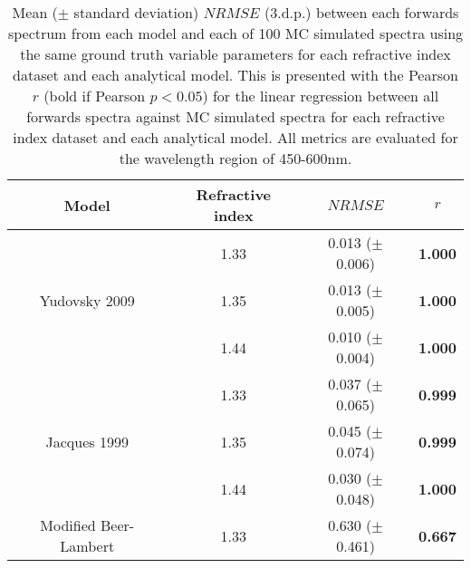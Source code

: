 \begin{table}[bhp]
    \centering
    \caption{Mean ($\pm$ standard deviation) $NRMSE$ (3.d.p.) between each forwards spectrum from each model and each of 100 MC simulated spectra using the same ground truth variable parameters for each refractive index dataset and each analytical model. This is presented with the Pearson $r$ (bold if Pearson $p < 0.05$) for the linear regression between all forwards spectra against MC simulated spectra for each refractive index dataset and each analytical model. All metrics are evaluated for the wavelength region of 450-600nm.}
    \begin{tabular}{|c|c|c|c|}
        \hline
        Model & Refractive index & $NRMSE$ & $r$ \\
        \hline
        \multirow{3}{*}{Yudovsky 2009} & 1.33 & 0.013 ($\pm$ 0.006) & \textbf{1.000} \\
        & 1.35 & 0.013 ($\pm$ 0.005) & \textbf{1.000} \\
        & 1.44 & 0.010 ($\pm$ 0.004) & \textbf{1.000} \\
        \hline
        \multirow{3}{*}{Jacques 1999} & 1.33 & 0.037 ($\pm$ 0.065) & \textbf{0.999} \\
        & 1.35 & 0.045 ($\pm$ 0.074) & \textbf{0.999} \\
        & 1.44 & 0.030 ($\pm$ 0.048) & \textbf{1.000} \\
        \hline
        \multirow{3}{*}{Modified Beer-Lambert} & 1.33 & 0.630 ($\pm$ 0.461) & \textbf{0.667} \\

\end{tabular}
\end{table}
